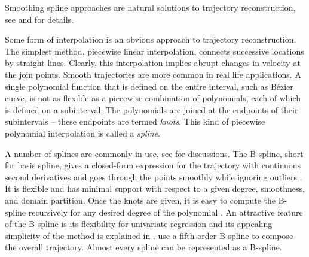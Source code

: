 Smoothing spline approaches are natural solutions to trajectory reconstruction, see 
\eg \cite{eubank2004simple} and \cite{durbin2012time} for details. 

Some form of interpolation is an obvious approach to trajectory reconstruction. The simplest method, piecewise linear interpolation, connects successive locations by straight lines. Clearly, this interpolation implies abrupt changes in velocity at the join points. Smooth trajectories are more common in real life applications. A single polynomial function that is defined on the entire interval, such as B\'ezier curve, is not as flexible as a piecewise combination of polynomials, each of which is defined on a subinterval. The polynomials are joined at the endpoints of their subintervals -- these endpoints are termed \textit{knots}. This kind of piecewise polynomial interpolation is called a \textit{spline}. 


A number of splines are commonly in use, see \cite{esl2009} for discussions. The B-spline, short for basis spline, gives a closed-form expression for the trajectory with continuous second derivatives and goes through the points smoothly while ignoring outliers \citep{komoriya1989trajectory, ben2004geometric}. It is flexible and has minimal support with respect to a given degree, smoothness, and domain partition. Once the knots are given, it is easy to compute the B-spline recursively for any desired degree of the polynomial \citep{de1978practical, cox1982practical}. An attractive feature of the B-spline is its flexibility for univariate regression and its appealing simplicity of the method is explained in \citep{dierckx1995curve, eilers1996flexible}. \cite{gasparetto2007new} use a fifth-order B-spline to compose the overall trajectory. Almost every spline can be represented as a B-spline. 

